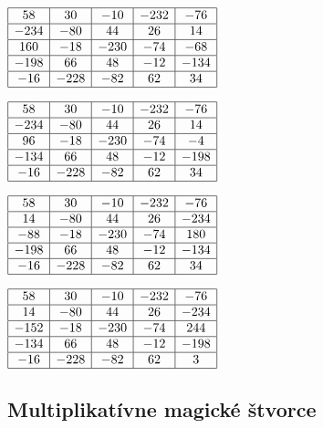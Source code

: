 \begin{center}
$\begin{array}{ |c|c|c|c|c| }
\hline
58 & 30 & -10 & -232 & -76 \\ 
\hline
-234 & -80 & 44 & 26 & 14  \\ 
\hline
160 & -18 & -230 & -74 & -68 \\ 
\hline
-198 & 66 & 48 & -12 & -134 \\ 
\hline
-16 & -228 & -82 & 62 & 34 \\ 
\hline
\end{array}$

$\begin{array}{ |c|c|c|c|c| } 
\hline
58 & 30 & -10 & -232 & -76 \\ 
\hline
-234 & -80 & 44 & 26 & 14  \\ 
\hline
96 & -18 & -230 & -74 & -4 \\ 
\hline
-134 & 66 & 48 & -12 & -198 \\ 
\hline
-16 & -228 & -82 & 62 & 34 \\ 
\hline
\end{array}$

$\begin{array}{ |c|c|c|c|c| }
\hline
58 & 30 & -10 & -232 & -76 \\ 
\hline
14 & -80 & 44 & 26 & -234 \\ 
\hline
-88 & -18 & -230 & -74 & 180 \\ 
\hline
-198 & 66 & 48 & -12 & -134 \\ 
\hline
-16 & -228 & -82 & 62 & 34 \\ 
\hline
\end{array}$

$\begin{array}{ |c|c|c|c|c| } 
\hline
58 & 30 & -10 & -232 & -76 \\ 
\hline
14 & -80 & 44 & 26 & -234 \\ 
\hline
-152 & -18 & -230 & -74 & 244 \\ 
\hline
-134 & 66 & 48 & -12 & -198 \\ 
\hline
-16 & -228 & -82 & 62 & 3 \\ 
\hline
\end{array}$
\end{center}



\subsection{Multiplikatívne magické štvorce}

